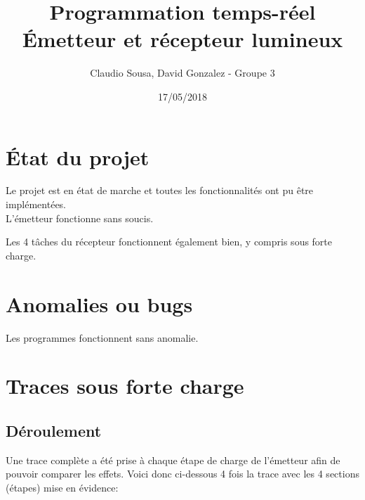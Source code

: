 \documentclass[11pt, a4paper]{article}
\begin{document}
\title
{
    \Huge{Programmation temps-réel} \\
    \Huge{Émetteur et récepteur lumineux}
}
\author
{
    \LARGE{Claudio Sousa, David Gonzalez - Groupe 3}
}
\date{17/05/2018}
\maketitle

\thispagestyle{empty}

\section{État du projet}

Le projet est en état de marche et
toutes les fonctionnalités ont pu être implémentées. \\

L'émetteur fonctionne sans soucis.

Les 4 tâches du récepteur fonctionnent également bien, y compris sous forte charge.

\section{Anomalies ou bugs}

Les programmes fonctionnent sans anomalie.

\section{Traces sous forte charge}

\subsection{Déroulement}

Une trace complète a été prise à chaque étape de charge de l'émetteur afin de pouvoir comparer les effets.
Voici donc ci-dessous 4 fois la trace avec les 4 sections (étapes) mise en évidence:
\end{document}
